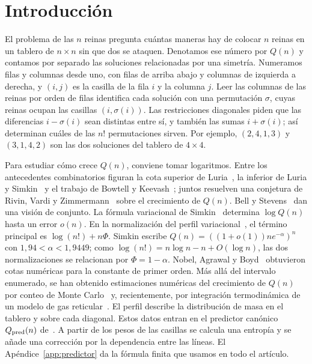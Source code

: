 \section{Introducción}
El problema de las $n$ reinas pregunta cuántas maneras hay de colocar $n$ reinas en un tablero de
$n\times n$ sin que dos se ataquen. Denotamos ese número por $Q(n)$ y contamos por separado las
soluciones relacionadas por una simetría. Numeramos filas y columnas desde uno, con filas de arriba
abajo y columnas de izquierda a derecha, y $(i,j)$ es la casilla de la fila $i$ y la columna $j$.
Leer las columnas de las reinas por orden de filas identifica cada solución con una permutación
$\sigma$, cuyas reinas ocupan las casillas $(i,\sigma(i))$. Las restricciones diagonales piden que
las diferencias $i-\sigma(i)$ sean distintas entre sí, y también las sumas $i+\sigma(i)$; así
determinan cuáles de las $n!$ permutaciones sirven. Por ejemplo, $(2,4,1,3)$ y $(3,1,4,2)$ son las
dos soluciones del tablero de $4\times4$.

Para estudiar cómo crece $Q(n)$, conviene tomar logaritmos. Entre los antecedentes combinatorios
figuran la cota superior de Luria~\cite{luria}, la inferior de Luria y Simkin~\cite{ls} y el
trabajo de Bowtell y Keevash~\cite{bk}; juntos resuelven una conjetura de Rivin, Vardi y
Zimmermann~\cite{rvz} sobre el crecimiento de $Q(n)$. Bell y Stevens~\cite{bs} dan una visión de conjunto.
La fórmula variacional de Simkin~\cite{simkin} determina $\log Q(n)$ hasta un error $o(n)$.
En la normalización del perfil variacional~\cite{pv}, el término principal es $\log(n!)+n\Phi$.
Simkin escribe $Q(n)=((1+o(1))ne^{-\alpha})^n$ con $1{,}94<\alpha<1{,}9449$; como
$\log(n!)=n\log n-n+O(\log n)$, las dos normalizaciones se relacionan por $\Phi=1-\alpha$.
Nobel, Agrawal y Boyd~\cite{nab} obtuvieron cotas numéricas para la constante de primer orden.
Más allá del intervalo enumerado, se han obtenido estimaciones numéricas del crecimiento de $Q(n)$ por
conteo de Monte Carlo~\cite{zm} y, recientemente, por integración termodinámica de un modelo de gas
reticular~\cite{llw}.
El perfil describe la distribución de masa en el tablero y sobre cada diagonal. Estos datos
entran en el predictor canónico $Q_{\rm pred}(n)$ de~\cite{pc}. A partir de los pesos de las casillas
se calcula una entropía y se añade una corrección por la dependencia entre las líneas. El
Apéndice~\ref{app:predictor} da la fórmula finita que usamos en todo el artículo.

